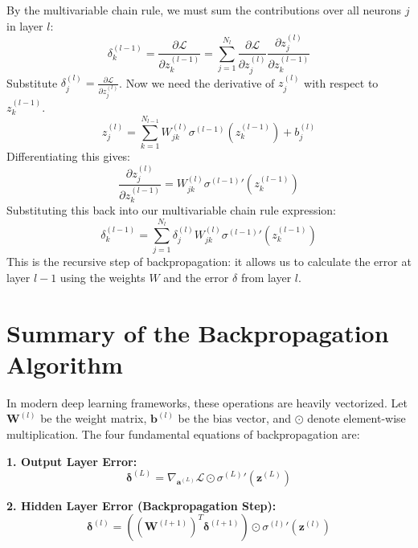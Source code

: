 \documentclass[11pt, a4paper]{article}
\begin{document}
By the multivariable chain rule, we must sum the contributions over all neurons $j$ in layer $l$:
\begin{equation}
    \delta_k^{(l-1)} = \frac{\partial \mathcal{L}}{\partial z_k^{(l-1)}} = \sum_{j=1}^{N_l} \frac{\partial \mathcal{L}}{\partial z_j^{(l)}} \frac{\partial z_j^{(l)}}{\partial z_k^{(l-1)}}
\end{equation}
Substitute $\delta_j^{(l)} = \frac{\partial \mathcal{L}}{\partial z_j^{(l)}}$. Now we need the derivative of $z_j^{(l)}$ with respect to $z_k^{(l-1)}$. 
\begin{equation}
    z_j^{(l)} = \sum_{k=1}^{N_{l-1}} W_{jk}^{(l)} \sigma^{(l-1)}(z_k^{(l-1)}) + b_j^{(l)}
\end{equation}
Differentiating this gives:
\begin{equation}
    \frac{\partial z_j^{(l)}}{\partial z_k^{(l-1)}} = W_{jk}^{(l)} {\sigma^{(l-1)}}'(z_k^{(l-1)})
\end{equation}
Substituting this back into our multivariable chain rule expression:
\begin{equation}
    \delta_k^{(l-1)} = \sum_{j=1}^{N_l} \delta_j^{(l)} W_{jk}^{(l)} {\sigma^{(l-1)}}'(z_k^{(l-1)})
\end{equation}
This is the recursive step of backpropagation: it allows us to calculate the error at layer $l-1$ using the weights $W$ and the error $\delta$ from layer $l$.

\section{Summary of the Backpropagation Algorithm}

In modern deep learning frameworks, these operations are heavily vectorized. Let $\mathbf{W}^{(l)}$ be the weight matrix, $\mathbf{b}^{(l)}$ be the bias vector, and $\odot$ denote element-wise multiplication. The four fundamental equations of backpropagation are:

\vspace{0.5cm}
\noindent\textbf{1. Output Layer Error:}
\begin{equation}
    \mathbf{\delta}^{(L)} = \nabla_{\mathbf{a}^{(L)}} \mathcal{L} \odot {\sigma^{(L)}}'(\mathbf{z}^{(L)})
\end{equation}

\noindent\textbf{2. Hidden Layer Error (Backpropagation Step):}
\begin{equation}
    \mathbf{\delta}^{(l)} = \left( (\mathbf{W}^{(l+1)})^T \mathbf{\delta}^{(l+1)} \right) \odot {\sigma^{(l)}}'(\mathbf{z}^{(l)})
\end{equation}
\end{document}

